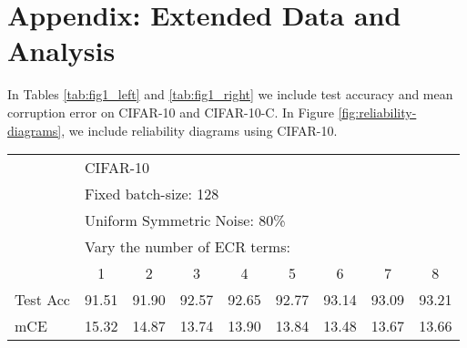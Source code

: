 \documentclass{article}
\begin{document}
\section{Appendix: Extended Data and Analysis}
\label{sec:ablation_more_data}

In Tables \ref{tab:fig1_left} and \ref{tab:fig1_right} we include test accuracy and mean corruption error on CIFAR-10 and CIFAR-10-C. In Figure \ref{fig:reliability-diagrams}, we include reliability diagrams using CIFAR-10.

\begin{table*}[h]
    \renewcommand{\arraystretch}{1.3}
    \centering
    \caption{RTE test accuracy and mean corruption error (mCE) on CIFAR-10 and CIFAR-10-C, respectively.  In this experiment, fixed batch size of  is used and the number of ECR terms,  is varied.  Training configuration of these data is described in section \ref{sec:expt:us}.  Test accuracy is presented in Figure \ref{fig:ecr_term_batch_size} (left).}\begin{tabular}{lcccccccc}
        \toprule
        &\multicolumn{8}{l}{CIFAR-10} \\
        &\multicolumn{8}{l}{Fixed batch-size: 128} \\
        &\multicolumn{8}{l}{Uniform Symmetric Noise: 80\%} \\
        \hline
        &\multicolumn{8}{l}{Vary the number of ECR terms: } \\
         & 1 & 2 & 3 & 4 & 5 & 6 & 7 & 8 \\
         \hline
          Test Acc & 91.51 & 91.90 & 92.57 & 92.65 & 92.77  & 93.14 & 93.09 & 93.21 \\
          mCE & 15.32 & 14.87 & 13.74 & 13.90 & 13.84 & 13.48 & 13.67 & 13.66 \\
         \bottomrule
    \end{tabular}
    \label{tab:fig1_left}
\end{table*}
\end{document}
